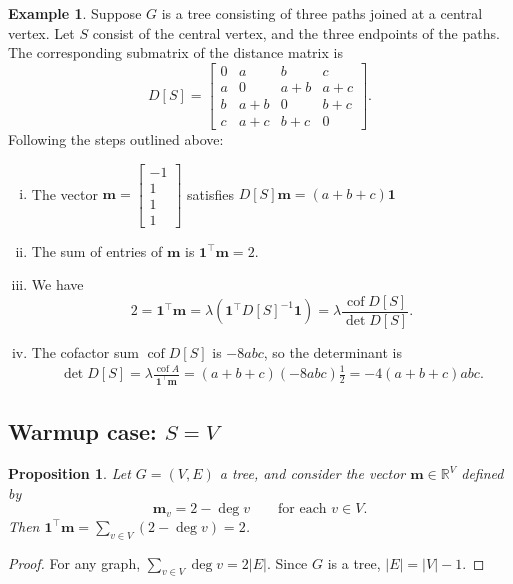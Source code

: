 \documentclass{amsart}
\newtheorem{prop}[thm]{Proposition}
\theoremstyle{definition}
\newtheorem{eg}[thm]{Example}
\newcommand{\RR}{\mathbb{R}}
\newcommand{\boldm}{\mathbf{m}}
\newcommand{\tr}{\intercal}
\DeclareMathOperator{\cof}{cof}
\begin{document}
\begin{eg}
Suppose $G$ is a tree consisting of three paths joined at a central vertex.
Let $S$ consist of the central vertex, and the three endpoints of the paths. 
The corresponding submatrix of the distance matrix is
$$
D[S] = \begin{bmatrix}
0 & a & b & c \\
a & 0 & a + b & a + c \\
b & a + b & 0 & b + c \\
c & a + c & b + c & 0
\end{bmatrix}.
$$
Following the steps outlined above:
\begin{enumerate}[(i)]
\item 
The vector $\boldm = \begin{bmatrix} -1 \\ 1 \\ 1 \\ 1 \end{bmatrix}$ satisfies
$
D[S] \boldm = (a+b+c) \mathbf{1}
$

\item 
The sum of entries of $\boldm$ is $\mathbf{1}^\tr \boldm = 2$.

\item 
We have 
$$2 = \mathbf{1}^\tr \boldm = \lambda (\mathbf{1}^\tr D[S]^{-1} \mathbf{1}) = \displaystyle \lambda \frac{\cof D[S]}{\det D[S]}.$$

\item 
The cofactor sum  
$\cof D[S]$ is $-8 abc$,
so the determinant is
\begin{align*}
\det D[S] 
= \lambda \frac{\cof A}{\mathbf{1}^\tr \boldm}
= (a+b+c) (-8 abc)\frac{1}{2}
= -4(a+b+c)abc.
\end{align*}
\end{enumerate}
\end{eg}

\subsection{Warmup case: $S = V$}

\begin{prop}
Let $G = (V,E)$ a tree, and consider the vector $\boldm \in \RR^V$
defined by 
\begin{equation}
\boldm_v = 2 - \deg v
\qquad\text{for each }v\in V.
\end{equation}
Then $\mathbf{1}^\tr \boldm = \sum_{v \in V} (2-\deg v) = 2$.
\end{prop}
\begin{proof}
For any graph, $\sum_{v\in V} \deg v = 2 |E|$.
Since $G$ is a tree, $|E| = |V|-1$.
\end{proof}
\end{document}
